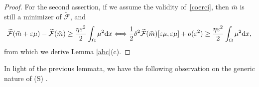 \documentclass[10pt,a4paper,nouppercase,nowrite]{article}
\numberwithin{equation}{section}
\newcommand{\di}{{\rm d}}
\newcommand{\Sp}{{\textsc (S)} }
\newcommand{\eps}{\varepsilon}
\newcommand{\F}{\widetilde{\mathcal{F}}}
\newcommand{\R}{\mathbb{R}}
\theoremstyle{definition}
\newtheorem{rmk}[defn]{Remark}
\begin{document}
\begin{proof}
	
	
	For the second assertion, if we assume the validity of~\eqref{coerci}, then $\bar m$ is still a minimizer of $\F$, and
	\begin{equation*}
		\widetilde{\mathcal{F}}(\bar{m}+\eps \mu) - \widetilde{\mathcal{F}}(\bar{m}) \geq \frac{\eta \eps^2}{2} \int_{\Omega} \mu^2 \di x \Longleftrightarrow \frac12 \delta^2\F(\bar m)[\eps \mu, \eps \mu] +o(\eps^2) \geq \frac{\eta\eps^2}{2} \int_{\Omega} \mu^2 \di x,
	\end{equation*}
	from which we derive Lemma \ref{abc}(c).
\end{proof}



In light of the previous lemmata, we have the following observation on the generic nature of \Sp.
\end{document}
